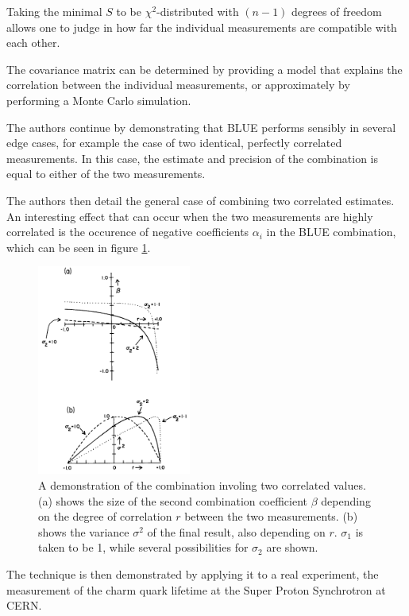Taking the minimal $S$ to be $\chi^2$-distributed with $(n - 1)$ degrees of freedom allows one to judge in how far the individual measurements are compatible with each other.

The covariance matrix can be determined by providing a model that explains the correlation between the individual measurements, or approximately by performing a Monte Carlo simulation.

The authors continue by demonstrating that BLUE performs sensibly in several edge cases, for example the case of two identical, perfectly correlated measurements.
In this case, the estimate and precision of the combination is equal to either of the two measurements.

The authors then detail the general case of combining two correlated estimates.
An interesting effect that can occur when the two measurements are highly correlated is the occurence of negative coefficients $α_i$ in the BLUE combination, which can be seen in figure \ref{simple}.

\begin{figure}
  \centering
  \includegraphics[width=0.45\textwidth]{./figures/simple.pdf}
  \caption{A demonstration of the combination involing two correlated values. (a) shows the size of the second combination coefficient $β$ depending on the degree of correlation $r$ between the two measurements. (b) shows the variance $σ^2$ of the final result, also depending on $r$. $σ_1$ is taken to be 1, while several possibilities for $σ_2$ are shown. \cite{lyons}}
  \label{simple}
\end{figure}

The technique is then demonstrated by applying it to a real experiment, the measurement of the charm quark lifetime at the Super Proton Synchrotron at CERN.

